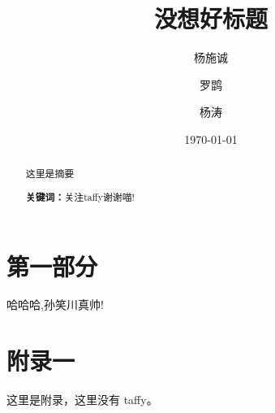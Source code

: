 \documentclass{ctexart}
\title{没想好标题}
\author{杨施诚 \and 罗鹍 \and 杨涛}
\date{\today}
\begin{document}
    \maketitle
    \begin{abstract}
        {\noindent 这里是摘要}
        \par\noindent \textbf{关键词：}关注taffy谢谢喵!
    \end{abstract}

    \newpage
    \tableofcontents

    \newpage
    \section{第一部分}
    哈哈哈,孙笑川真帅!

    \newpage
    \appendix
    \section{附录一}
    这里是附录，这里没有 taffy。


    
\end{document}

